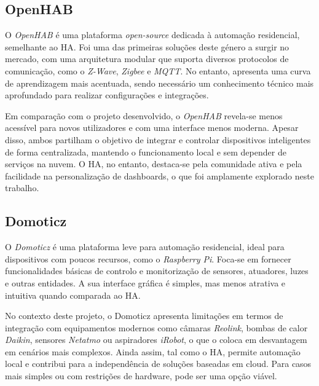\subsection{OpenHAB}

O \textit{OpenHAB} é uma plataforma \textit{open-source} dedicada à automação residencial, semelhante ao \gls{HA}. Foi uma das primeiras soluções deste género a surgir no mercado, com uma arquitetura modular que suporta diversos protocolos de comunicação, como o \textit{Z-Wave}, \textit{Zigbee} e \textit{MQTT}. No entanto, apresenta uma curva de aprendizagem mais acentuada, sendo necessário um conhecimento técnico mais aprofundado para realizar configurações e integrações.

Em comparação com o projeto desenvolvido, o \textit{OpenHAB} revela-se menos acessível para novos utilizadores e com uma interface menos moderna. Apesar disso, ambos partilham o objetivo de integrar e controlar dispositivos inteligentes de forma centralizada, mantendo o funcionamento local e sem depender de serviços na nuvem. O \gls{HA}, no entanto, destaca-se pela comunidade ativa e pela facilidade na personalização de dashboards, o que foi amplamente explorado neste trabalho.


\subsection{Domoticz}

O \textit{Domoticz} é uma plataforma leve para automação residencial, ideal para dispositivos com poucos recursos, como o \textit{Raspberry Pi}. Foca-se em fornecer funcionalidades básicas de controlo e monitorização de sensores, atuadores, luzes e outras entidades. A sua interface gráfica é simples, mas menos atrativa e intuitiva quando comparada ao \gls{HA}.

No contexto deste projeto, o Domoticz apresenta limitações em termos de integração com equipamentos modernos como câmaras \textit{Reolink}, bombas de calor \textit{Daikin}, sensores \textit{Netatmo} ou aspiradores \textit{iRobot}, o que o coloca em desvantagem em cenários mais complexos. Ainda assim, tal como o \gls{HA}, permite automação local e contribui para a independência de soluções baseadas em cloud. Para casos mais simples ou com restrições de hardware, pode ser uma opção viável.

